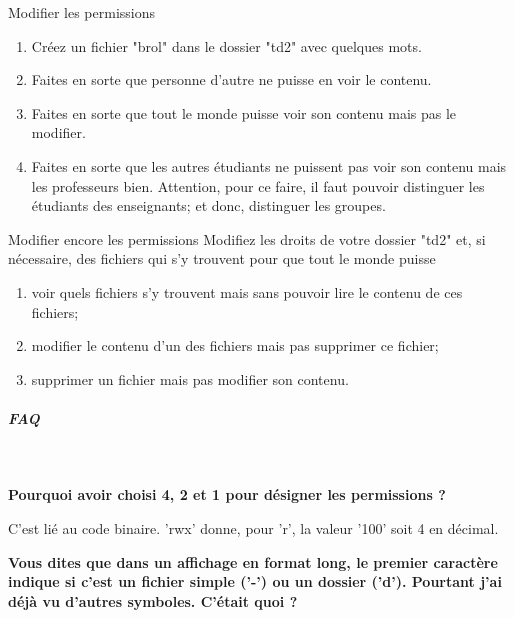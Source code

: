 \documentclass[a4paper,11pt]{article}
\begin{document}
\par
	
	\begin{Tutoriel}{Modifier les permissions} 
\begin{enumerate}	
	\item Cr\'eez un fichier "brol" dans le dossier "td2" avec quelques mots.
	\item Faites en sorte que personne d'autre ne puisse en voir le contenu.
	\item Faites en sorte que tout le monde puisse voir son contenu mais pas le modifier. 
	\item 
	Faites en sorte que les autres \'etudiants ne puissent pas voir son contenu mais les professeurs bien. 
	Attention, pour ce faire, il faut pouvoir distinguer les \'etudiants des enseignants; et donc, distinguer les groupes.
	
\end{enumerate}
		
	\end{Tutoriel}

	\begin{Tutoriel}{Modifier encore les permissions}           
Modifiez les droits de votre dossier "td2" et, si n\'ecessaire, 
des fichiers qui s'y trouvent pour que tout le monde puisse  
\begin{enumerate}
	
	\item voir quels fichiers s'y trouvent mais sans pouvoir lire le contenu de ces fichiers;
	\item modifier le contenu d'un des fichiers mais pas supprimer ce fichier;
	\item supprimer un fichier mais pas modifier son contenu.
\end{enumerate}
	
\end{Tutoriel}


		\subparagraph{FAQ} 

\textcolor{white}{.} \par

\par
\textbf{Pourquoi avoir choisi 4, 2 et 1 pour d\'esigner les permissions ?}
\par

C'est li\'e au code binaire. 'rwx' donne, pour 'r', la valeur '100' soit 4 en d\'ecimal.  

\par
\textbf{Vous dites que dans un affichage en format long, 
	le premier caract\`ere indique si c'est un fichier simple ('-') ou un dossier ('d'). 
	Pourtant j'ai d\'ej\`a vu d'autres symboles. C'\'etait quoi ?
}
\par
\end{document}
